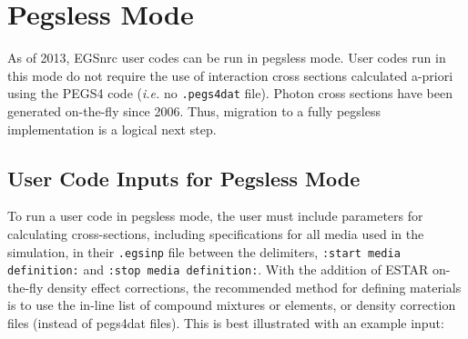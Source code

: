 
%
%
%
%
%
%
%
%
%




\section{Pegsless Mode}
\label{pegsless}

As of 2013, EGSnrc user codes can be run in pegsless mode.  User codes run in this mode do not
require the use of interaction cross sections calculated a-priori using the PEGS4 code
({\em i.e.} no {\tt .pegs4dat} file).  Photon cross
sections have been generated on-the-fly since 2006.  Thus, migration to a fully pegsless implementation
is a logical next step.

\subsection{User Code Inputs for Pegsless Mode}
\label{pegslessinputsect}

To run a user code in pegsless mode, the user must include parameters for calculating cross-sections, including specifications for all media used in the simulation, in their {\tt .egsinp} file between the
delimiters, {\tt :start media definition:} and {\tt :stop media definition:}. With the addition of ESTAR on-the-fly density effect corrections, the recommended method for defining materials is to use the in-line list of compound mixtures or elements, or density correction files (instead of pegs4dat files). This is best illustrated with an example input:

